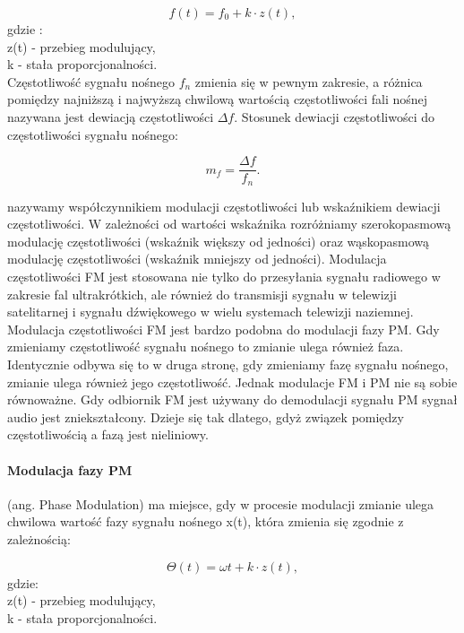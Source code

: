 \documentclass[]{report}
\begin{document}
\begin{equation}
f(t)=f_0+k\cdot z(t),
\end{equation}
gdzie : \\
z(t) - przebieg modulujący,\\
k - stała proporcjonalności.\\

Częstotliwość sygnału nośnego $f_n$ zmienia się w pewnym zakresie, a różnica pomiędzy najniższą i najwyższą chwilową wartością częstotliwości fali nośnej nazywana jest dewiacją częstotliwości $\Delta f$. Stosunek dewiacji częstotliwości do częstotliwości sygnału nośnego:

\begin{equation}
 m_f=\dfrac{\Delta f}{f_n}. 
\end{equation}

nazywamy współczynnikiem modulacji częstotliwości lub wskaźnikiem dewiacji częstotliwości. W zależności od wartości wskaźnika rozróżniamy szerokopasmową modulację częstotliwości (wskaźnik większy od jedności) oraz wąskopasmową modulację częstotliwości (wskaźnik mniejszy od jedności). Modulacja częstotliwości FM jest stosowana nie tylko do przesyłania sygnału radiowego w zakresie fal ultrakrótkich, ale również do transmisji sygnału w telewizji satelitarnej i sygnału dźwiękowego w wielu systemach telewizji naziemnej. Modulacja częstotliwości FM jest bardzo podobna do modulacji fazy PM. Gdy zmieniamy częstotliwość sygnału nośnego to zmianie ulega również faza. Identycznie odbywa się to w druga stronę, gdy zmieniamy fazę sygnału nośnego, zmianie ulega również jego częstotliwość. Jednak modulacje FM i PM nie są sobie równoważne. Gdy odbiornik FM jest używany do demodulacji sygnału PM sygnał audio jest zniekształcony. Dzieje się tak dlatego, gdyż związek pomiędzy częstotliwością a fazą jest nieliniowy. 

\paragraph{Modulacja fazy PM} (ang. Phase Modulation) ma miejsce, gdy w procesie modulacji zmianie ulega chwilowa wartość fazy sygnału nośnego x(t), która zmienia się zgodnie z zależnością:

\begin{equation}
\Theta (t)=\omega t+k\cdot z(t),
\end{equation}
gdzie: \\
z(t) - przebieg modulujący,\\
k - stała proporcjonalności. \\
\end{document}
